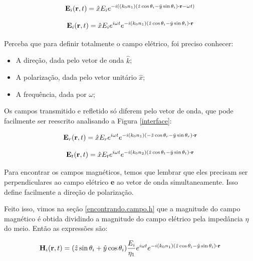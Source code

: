 \documentclass[12pt,a4paper]{report}
\begin{document}
\begin{equation*}
    \textbf{E}_i(\textbf{r},t)=\hat{x}E_ie^{-i((k_0n_1)(\hat{z}\cos\theta_i-\hat{y}\sin\theta_i)\vdot\textbf{r}-\omega t)}
\end{equation*}

\begin{equation*}
    \textbf{E}_i(\textbf{r},t)=\hat{x}E_ie^{i\omega t}e^{-i(k_0n_1)(\hat{z}\cos\theta_i-\hat{y}\sin\theta_i)\vdot\textbf{r}}
\end{equation*}

Perceba que para definir totalmente o campo elétrico, foi preciso conhecer:

\begin{itemize}
    \item A direção, dada pelo vetor de onda $\hat{k}$;
    \item A polarização, dada pelo vetor unitário $\hat{x}$;
    \item A frequência, dada por $\omega$;
\end{itemize}

Os campos transmitido e refletido só diferem pelo vetor de onda, que pode facilmente ser reescrito analisando a Figura \ref{interface}:

\begin{equation*}
    \textbf{E}_r(\textbf{r},t)=\hat{x}E_re^{i\omega t}e^{-i(k_0n_1)(-\hat{z}\cos\theta_r-\hat{y}\sin\theta_r)\vdot\textbf{r}}
\end{equation*}

\begin{equation*}
    \textbf{E}_t(\textbf{r},t)=\hat{x}E_te^{i\omega t}e^{-i(k_0n_2)(\hat{z}\cos\theta_t-\hat{y}\sin\theta_t)\vdot\textbf{r}}
\end{equation*}

Para encontrar os campos magnéticos, temos que lembrar que eles precisam ser perpendiculares ao campo elétrico \textbf{e} ao vetor de onda simultaneamente. Isso define facilmente a direção de polarização.

Feito isso, vimos na seção \ref{encontrando.campo.h} que a magnitude do campo magnético é obtida dividindo a magnitude do campo elétrico pela impedância $\eta$ do meio.
Então as expressões são:

\begin{equation*}
    \textbf{H}_i(\textbf{r},t)=(\hat{z}\sin\theta_i+\hat{y}\cos\theta_i)\frac{E_i}{\eta_1}e^{i\omega t}e^{-i(k_0n_1)(\hat{z}\cos\theta_i-\hat{y}\sin\theta_i)\vdot\textbf{r}}
\end{equation*}
\end{document}
